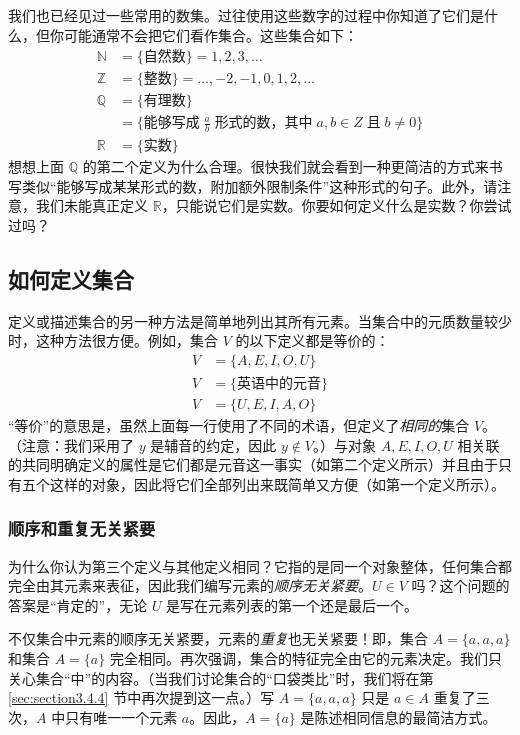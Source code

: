 我们也已经见过一些常用的数集。过往使用这些数字的过程中你知道了它们是什么，但你可能通常不会把它们看作集合。这些集合如下：
\begin{align*}
    \mathbb{N} &= \{ \text{自然数} \} = {1, 2, 3, \dots}\\
    \mathbb{Z} &= \{ \text{整数} \} = {\dots , -2, -1, 0, 1, 2, \dots}\\
    \mathbb{Q} &= \{ \text{有理数} \}\\
      &= \{ \text{能够写成}\; \frac{a}{b} \;\text{形式的数，其中}\; a, b \in Z \;\text{且}\; b \ne 0 \}\\
      \mathbb{R} &= \{ \text{实数}\}
\end{align*}
想想上面 $\mathbb{Q}$ 的第二个定义为什么合理。很快我们就会看到一种更简洁的方式来书写类似``能够写成某某形式的数，附加额外限制条件''这种形式的句子。此外，请注意，我们未能真正定义 $\mathbb{R}$，只能说它们是实数。你要如何定义什么是实数？你尝试过吗？

\subsection{如何定义集合}

定义或描述集合的另一种方法是简单地列出其所有元素。当集合中的元质数量较少时，这种方法很方便。例如，集合 $V$ 的以下定义都是等价的：
\begin{align*}
    V &= \{A,E,I,O,U\}\\
    V &= \{\text{英语中的元音}\}\\
    V &= \{U,E,I,A,O\}
\end{align*}
``等价''的意思是，虽然上面每一行使用了不同的术语，但定义了\textit{相同的}集合 $V$。（注意：我们采用了 $y$ 是辅音的约定，因此 $y \notin V$。）与对象 $A, E, I, O, U$ 相关联的共同明确定义的属性是它们都是元音这一事实（如第二个定义所示）并且由于只有五个这样的对象，因此将它们全部列出来既简单又方便（如第一个定义所示）。

\subsubsection*{顺序和重复无关紧要}

为什么你认为第三个定义与其他定义相同？它指的是同一个对象整体，任何集合都完全由其元素来表征，因此我们编写元素的\textit{顺序无关紧要}。$U \in V$ 吗？这个问题的答案是``肯定的''，无论 $U$ 是写在元素列表的第一个还是最后一个。

不仅集合中元素的顺序无关紧要，元素的\textit{重复}也无关紧要！即，集合 $A=\{a,a,a\}$ 和集合 $A=\{a\}$ 完全相同。再次强调，集合的特征完全由它的元素决定。我们只关心集合``中''的内容。（当我们讨论集合的``口袋类比''时，我们将在第 \ref{sec:section3.4.4} 节中再次提到这一点。）写 $A = \{a, a, a\}$ 只是 $a \in A$ 重复了三次，$A$ 中只有唯一一个元素 $a$。因此，$A = \{a\}$ 是陈述相同信息的最简洁方式。

